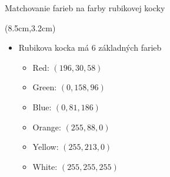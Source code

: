 \begin{frame}{Matchovanie farieb na farby rubikovej kocky}
\begin{textblock*}{3cm}(8.5cm,3.2cm)
\end{textblock*}
\begin{itemize}
\item<2->{Rubikova kocka má 6 základných farieb}
    \begin{itemize}
    \item<2-> Red: $(196, 30, 58)$
    \item<2-> Green: $(0, 158, 96)$
    \item<2-> Blue: $(0, 81, 186)$
    \item<2-> Orange: $(255, 88, 0)$
    \item<2-> Yellow: $(255, 213, 0)$
    \item<2-> White: $(255, 255, 255)$
    \end{itemize}
\end{itemize}
\end{frame}

